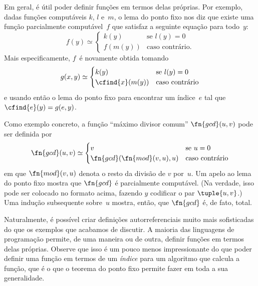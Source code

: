 \documentclass[../../../include/open-logic-section]{subfiles}
\begin{document}

Em geral, é útil poder definir funções em termos delas próprias. Por
exemplo, dadas funções computáveis $k$, $l$ e~$m$, o lema do ponto
fixo nos diz que existe uma função parcialmente computável~$f$ que
satisfaz a seguinte equação para todo~$y$:
\[
f(y) \simeq
\begin{cases}
k(y) & \text{se $l(y) = 0$} \\
f(m(y)) & \text{caso contrário.}
\end{cases}
\]
Mais especificamente, $f$~é novamente obtida tomando
\[
g(x,y) \simeq
\begin{cases}
k(y) & \text{se $l(y) = 0$} \\
\cfind{x}(m(y)) & \text{caso contrário}
\end{cases}
\]
e usando então o lema do ponto fixo para encontrar um índice~$e$ tal
que $\cfind{e}(y) = g(e,y)$.

Como exemplo concreto, a função ``máximo divisor comum''
$\fn{gcd}(u,v)$ pode ser definida por
\[
\fn{gcd}(u,v) \simeq
\begin{cases}
v & \text{se $u = 0$} \\
\fn{gcd}(\fn{mod}(v, u), u) & \text{caso contrário}
\end{cases}
\]
em que $\fn{mod}(v, u)$ denota o resto da divisão de $v$
por~$u$. Um apelo ao lema do ponto fixo mostra que $\fn{gcd}$ é
parcialmente computável. (Na verdade, isso pode ser colocado no
formato acima, fazendo $y$ codificar o par $\tuple{u, v}$.) Uma indução
subsequente sobre~$u$ mostra, então, que $\fn{gcd}$ é, de fato, total.

Naturalmente, é possível criar definições autorreferenciais muito mais
sofisticadas do que os exemplos que acabamos de discutir. A maioria
das linguagens de programação permite, de uma maneira ou de outra,
definir funções em termos delas próprias. Observe que isso é um pouco
menos impressionante do que poder definir uma função em termos de um
\emph{índice} para um algoritmo que calcula a função, que é o que o
teorema do ponto fixo permite fazer em toda a sua generalidade.
\end{document}
